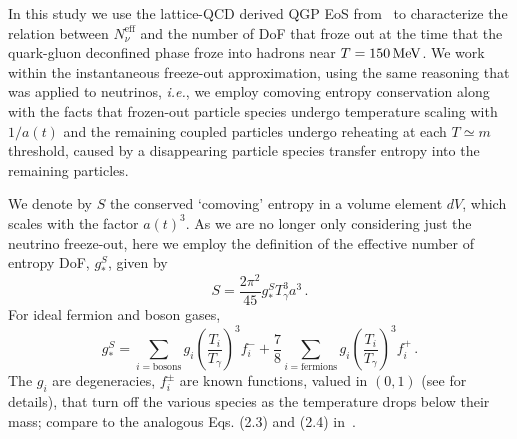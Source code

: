 In this study we use the lattice-QCD derived QGP EoS from~\cite{Borsanyi:2013bia} to characterize the relation between $N^{\text{eff}}_{\nu}$ and the number of DoF that froze out at the time that the quark-gluon deconfined phase froze into hadrons near $T=150\text{\,MeV}$. We work within the instantaneous freeze-out approximation, using the same reasoning that was applied to neutrinos, {\it i.e.\/}, we employ comoving entropy conservation along with the facts that frozen-out particle species undergo temperature scaling with $1/a(t)$ and the remaining coupled particles undergo reheating at each $T\simeq m$ threshold, caused by a disappearing particle species transfer entropy into the remaining particles.



We denote by $S$ the conserved `comoving' entropy in a volume element $dV$, which scales with the factor $a(t)^3$. As we are no longer only considering just the neutrino freeze-out, here we employ the definition of the effective number of entropy DoF, $g_*^S$, given by
\begin{equation}
S=\frac{2\pi^2}{45}g^S_*T_\gamma^3 a^3\,.
\end{equation} 
For ideal fermion and boson gases, 
\begin{equation}
g_*^S=\!\!\!\!\sum_{i=\text{bosons}}\!\!\!\!g_i \left(\frac{T_i}{T_\gamma}\right)^3\!\!\!f_i^-+\frac{7}{8}\!\!\!\sum_{i=\text{fermions}}\!\!\!\! g_i \left(\frac{T_i}{T_\gamma}\right)^3\!\!\!f_i^+\,.
\end{equation}
The $g_i$ are degeneracies, $f_i^\pm$ are known functions, valued in $(0,1)$ (see  for details), that turn off the various species as the temperature drops below their mass; compare to the analogous Eqs. (2.3) and (2.4) in~\cite{Blennow:2012de}. 


